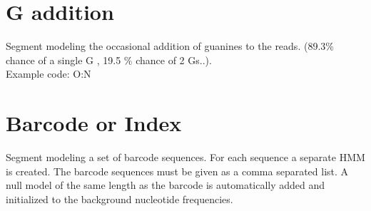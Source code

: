 \documentclass[11pt,a4paper,oneside]{book}
\begin{document}
\newpage
\section{G addition}
Segment modeling the occasional addition of guanines to the reads. (89.3\% chance of a single G , 19.5 \% chance of  2 Gs..).\\
Example code: O:N\\


\begin{figure}[H]
\centering
{}
\end{figure}



\section{Barcode or Index}

Segment modeling a set of barcode sequences. For each sequence a separate HMM is created. The barcode sequences must be given as a comma separated list. A null model of the same length as the barcode is automatically added and initialized to the background nucleotide frequencies. \\
\end{document}
